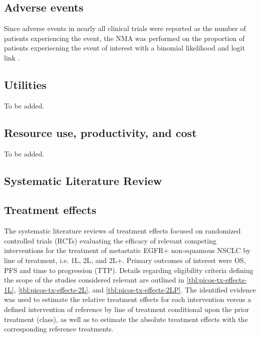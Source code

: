 \documentclass[11pt,final,fleqn]{article}\usepackage[]{graphicx}\usepackage[]{color}
\theoremstyle{plain}
\begin{document}
{\subsection{Adverse events}\label{subsec:data-aes}
Since adverse events in nearly all clinical trials were reported as the number of patients experiencing the event, the NMA was performed on the proportion of patients experiecning the event of interest with a binomial likelihood and logit link \citep[Chapter~2]{dias2018network}.

\subsection{Utilities}\label{subsec:data-utility}
To be added.

\subsection{Resource use, productivity, and cost}\label{subsec:data-costs}
To be added.


\begin{appendices}
\setcounter{table}{0}
\renewcommand{\thetable}{A\arabic{table}}
\setcounter{figure}{0}
\renewcommand{\thefigure}{A\arabic{figure}}
\setcounter{equation}{0}
\renewcommand{\theequation}{A\arabic{equation}}

\section{Systematic Literature Review}\label{app:slr}

\subsection{Treatment effects}

The systematic literature reviews of treatment effects focused on randomized controlled trials (RCTs) evaluating the efficacy of relevant competing interventions for the treatment of metastatic EGFR+ non-squamous NSCLC by line of treatment, i.e. 1L, 2L, and 2L+. Primary outcomes of interest were OS, PFS and time to progression (TTP). Details regarding eligibility criteria defining the scope of the studies considered relevant are outlined in \autoref{tbl:picos-tx-effects-1L}, \autoref{tbl:picos-tx-effects-2L}, and \autoref{tbl:picos-tx-effects-2LP}. The identified evidence was used to estimate the relative treatment effects for each intervention versus a defined intervention of reference by line of treatment conditional upon the prior treatment (class), as well as to estimate the absolute treatment effects with the corresponding reference treatments.



\end{appendices}}
\end{document}
